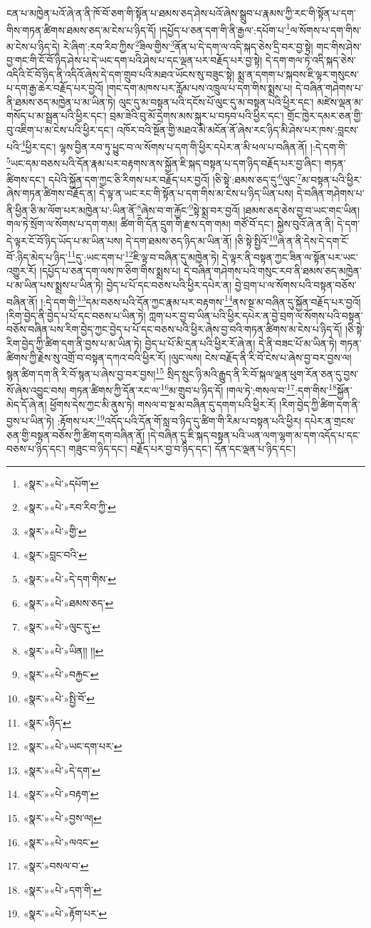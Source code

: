 ངན་པ་མཁྱེན་པའོ་ཞེ་ན་ནི་ཁོ་བོ་ཅག་གི་སྟོན་པ་ཐམས་ཅད་ཤེས་པའོ་ཞེས་སྒྲུབ་པ་རྣམས་ཀྱི་རང་གི་སྟོན་པ་དག་གིས་གཏན་ཚིགས་ཐམས་ཅད་མ་ངེས་པ་ཉིད་དོ། །དཔྱོད་པ་ཅན་དག་གི་ནི་རྒྱལ་:དཔོག་པ་\footnote{«སྣར་»«པེ་»དཔོག་}ལ་སོགས་པ་དག་གིས་མ་ངེས་པ་ཉིད་དེ། རེ་ཞིག་:རབ་རིབ་ཀྱིས་\footnote{«སྣར་»«པེ་»རབ་རིབ་ཀྱི་}ཟིལ་གྱིས་\footnote{«སྣར་»«པེ་»གྱི་}ནོན་པ་དེ་དག་ལ་འདི་སྐད་ཅེས་དྲི་བར་བྱ་སྟེ། གང་གིས་ཤེས་བྱ་གང་གི་ངོ་བོ་ཉིད་ཤེས་པ་དེ་ཡང་དག་པའི་ཤེས་པ་དང་ལྡན་པར་བརྗོད་པར་བྱ་སྟེ། དེ་དག་གལ་ཏེ་འདི་སྐད་ཅེས་འདིའི་ངོ་བོ་ཉིད་ནི་འདིའོ་ཞེས་དེ་དག་གྲུབ་པའི་མཐའ་ཡོངས་སུ་བཟུང་སྟེ། སྨྲ་ན་དགག་པ་སྐབས་ཇི་ལྟར་གསུངས་པ་དག་རྒྱ་ཆེར་བརྗོད་པར་བྱའོ། །གང་དག་མཁས་པར་རློམ་པས་འཁྲུལ་པ་དག་གིས་སྨྲས་པ། དེ་བཞིན་གཤེགས་པ་ནི་ཐམས་ཅད་མཁྱེན་པ་མ་ཡིན་ཏེ། ལུང་དུ་མ་བསྟན་པའི་དངོས་པོ་ལུང་དུ་མ་བསྟན་པའི་ཕྱིར་དང་། མཛེས་ལྡན་མ་གསོད་པ་མ་སྦྲན་པའི་ཕྱིར་དང་། བྲམ་ཟེའི་བུ་མོ་དྲེགས་མས་སྐུར་པ་བཏབ་པའི་ཕྱིར་དང་། གྲོང་ཁྱེར་དམར་ཅན་གྱི་བུ་འཇིག་པ་མ་ངེས་པའི་ཕྱིར་དང་། འཁོར་བའི་སྔོན་གྱི་མཐའ་མི་མངོན་ནོ་ཞེས་རང་ཉིད་མི་ཤེས་པར་ཁས་:བླངས་པའི་\footnote{«སྣར་»བླང་བའི་}ཕྱིར་དང་། ལྷས་བྱིན་རབ་ཏུ་ཕྱུང་བ་ལ་སོགས་པ་དག་གི་ཕྱིར་དཔེར་ན་མི་ཕལ་པ་བཞིན་ནོ། །:དེ་དག་གི་\footnote{«སྣར་»«པེ་»དེ་དག་གིས་}ཡང་དམ་བཅས་པའི་དོན་རྣམ་པར་བརྟགས་ནས་སྐྱོན་ཇི་སྐད་བསྟན་པ་དག་ཉིད་བརྗོད་པར་བྱ་ཞིང་། གཏན་ཚིགས་དང་། དཔེའི་སྐྱོན་དག་ཀྱང་ཅི་རིགས་པར་བརྗོད་པར་བྱའོ། །ཅི་སྟེ་:ཐམས་ཅད་དུ་\footnote{«སྣར་»«པེ་»ཐམས་ཅད་}ལུང་\footnote{«སྣར་»«པེ་»ལུང་དུ་}མ་བསྟན་པའི་ཕྱིར་ཞེས་གཏན་ཚིགས་བརྗོད་ན། དེ་ལྟ་ན་ཡང་རང་གི་སྟོན་པ་དག་གིས་མ་ངེས་པ་ཉིད་ཡིན་པས། དེ་བཞིན་གཤེགས་པ་ནི་ཕྱིན་ཅི་མ་ལོག་པར་མཁྱེན་པ་:ཡིན་ནོ་\footnote{«སྣར་»«པེ་»ཡིན།། །།}ཞེས་བ་ག་རྐྱོང་\footnote{«སྣར་»«པེ་»བརྐྱང་}སྟེ་སྨྲ་བར་བྱའོ། །ཐམས་ཅད་ཅེས་བྱ་བ་ཡང་གང་ཡིན། གལ་ཏེ་སྲོག་ལ་སོགས་པ་དག་གམ། ཚིག་གི་དོན་དྲུག་གི་རྫས་དག་གམ། གཙོ་བོ་དང་། སྐྱེས་བུའོ་ཞེ་ན་ནི། དེ་དག་དེ་ལྟར་ངོ་བོ་ཉིད་ཡོད་པ་མ་ཡིན་པས། དེ་དག་ཐམས་ཅད་ཉིད་མ་ཡིན་ནོ། །ཅི་སྟེ་སྤྱིའོ་\footnote{«སྣར་»«པེ་»སྤྱི་བོ་}ཞེ་ན་ནི་དེས་དེ་དག་ངོ་བོ་:ཉིད་མེད་པ་ཉིད་\footnote{«སྣར་»ཉིད་}དུ་:ཡང་དག་པ་\footnote{«སྣར་»«པེ་»ཡང་དག་པར་}ཇི་ལྟ་བ་བཞིན་དུ་མཁྱེན་ཏེ། དེ་ལྟར་ནི་བསྟན་ཀྱང་ཟིན་ལ་སྟོན་པར་ཡང་འགྱུར་རོ། །དཔྱོད་པ་ཅན་དག་ལས་ཁ་ཅིག་གིས་སྨྲས་པ། དེ་བཞིན་གཤེགས་པའི་གསུང་རབ་ནི་ཐམས་ཅད་མཁྱེན་པ་མ་ཡིན་པས་སྨྲས་པ་ཡིན་ཏེ། བྱེད་པ་པོ་དང་བཅས་པའི་ཕྱིར་དཔེར་ན། བྱེ་བྲག་པ་ལ་སོགས་པའི་བསྟན་བཅོས་བཞིན་ནོ། །:དེ་དག་གི་\footnote{«སྣར་»«པེ་»དེ་དག་}དམ་བཅས་པའི་དོན་ཀྱང་རྣམ་པར་བརྟགས་\footnote{«སྣར་»«པེ་»བརྟག་}ནས་སྔ་མ་བཞིན་དུ་སྐྱོན་བརྗོད་པར་བྱའོ། །རིག་བྱེད་ནི་བྱེད་པ་པོ་དང་བཅས་པ་ཡིན་ཏེ། ཀླག་པར་བྱ་བ་ཡིན་པའི་ཕྱིར་དཔེར་ན་བྱེ་བྲག་ལ་སོགས་པའི་བསྟན་བཅོས་བཞིན་པས་རིག་བྱེད་ཀྱང་བྱེད་པ་པོ་དང་བཅས་པའི་ཕྱིར་ཞེས་བྱ་བའི་གཏན་ཚིགས་མ་ངེས་པ་ཉིད་དོ། །ཅི་སྟེ་རིག་བྱེད་ཀྱི་ཚིག་དག་ནི་བྱས་པ་མ་ཡིན་ཏེ། བྱེད་པ་པོ་མི་དྲན་པའི་ཕྱིར་རོ་ཞེ་ན། དེ་ནི་བཟང་པོ་མ་ཡིན་ཏེ། གཏན་ཚིགས་ཀྱི་རྗེས་སུ་འགྲོ་བ་བསྟན་དཀའ་བའི་ཕྱིར་རོ། །ལུང་ལས། ངེས་བརྗོད་ནི་རི་བོ་ངེས་པ་ཞེས་བྱ་བར་བྱས་ལ། སྙན་ཚིག་དག་ནི་རི་བོ་སྙན་པ་ཞེས་བྱ་བར་བྱས།\footnote{«སྣར་»«པེ་»བྱས་ལ།} སྲིད་སྲུང་ཉི་མའི་རྒྱུད་ནི་རི་བོ་སྐལ་ལྡན་ཕུག་རོན་ཅན་དུ་བྱས་སོ་ཞེས་འབྱུང་བས། གཏན་ཚིགས་ཀྱི་དོན་རང་ལ་\footnote{«སྣར་»«པེ་»ལའང་}མ་གྲུབ་པ་ཉིད་དོ། །གལ་ཏེ་:གསལ་བ་\footnote{«སྣར་»བསལ་བ་}:དག་གིས་\footnote{«སྣར་»«པེ་»དག་གི་}སྐྱོན་མེད་དོ་ཞེ་ན། ཕྱོགས་དེས་ཀྱང་མི་ནུས་ཏེ། གསལ་བ་སྔ་མ་བཞིན་དུ་དགག་པའི་ཕྱིར་རོ། །རིག་བྱེད་ཀྱི་ཚིག་དག་ནི་བྱས་པ་ཡིན་ཏེ། :རྟོགས་པར་\footnote{«སྣར་»«པེ་»རྟོག་པར་}འདོད་པའི་དོན་གོ་སླ་བ་ཉིད་དུ་ཚིག་གི་རིམ་པ་བསྟན་པའི་ཕྱིར། དཔེར་ན་གྲངས་ཅན་གྱི་བསྟན་བཅོས་ཀྱི་ཚིག་དག་བཞིན་ནོ། །དེ་བཞིན་དུ་ཇི་སྐད་བསྟན་པའི་ཡན་ལག་ལྷག་མ་དག་འདོད་པ་དང་བཅས་པ་ཉིད་དང་། གཟུང་བ་ཉིད་དང་། བརྗོད་པར་བྱ་བ་ཉིད་དང་། དོན་དང་ལྡན་པ་ཉིད་དང་། 
